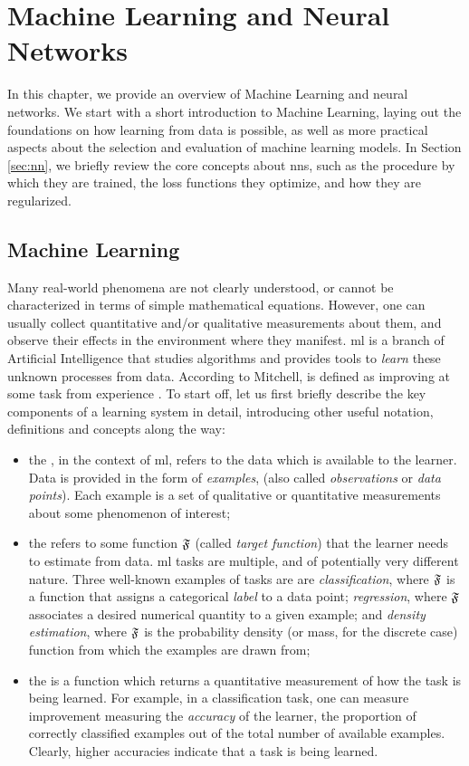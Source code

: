 \chapter{Machine Learning and Neural Networks}\label{ch:neural-networks}
In this chapter, we provide an overview of Machine Learning and neural networks. We start with a short introduction to Machine Learning, laying out the foundations on how learning from data is possible, as well as more practical aspects about the selection and evaluation of machine learning models. In Section \ref{sec:nn}, we briefly review the core concepts about \glspl{nn}, such as the procedure by which they are trained, the loss functions they optimize, and how they are regularized.

\section{Machine Learning}\label{sec:ml}
Many real-world phenomena are not clearly understood, or cannot be characterized in terms of simple mathematical equations. However, one can usually collect quantitative and/or qualitative measurements about them, and observe their effects in the environment where they manifest. \gls{ml} is a branch of Artificial Intelligence that studies algorithms and provides tools to \emph{learn} these unknown processes from data. According to Mitchell,  is defined as improving at some task from experience \citep{mitchell1997ml}. To start off, let us first briefly describe the key components of a learning system in detail, introducing other useful notation, definitions and concepts along the way:

\begin{itemize}
    \item the , in the context of \gls{ml}, refers to
    the data which is available to the learner. Data is provided in the form
    of \emph{examples}, (also called \emph{observations} or \emph{data points}). Each example is a set of qualitative or quantitative measurements about some phenomenon of interest;
    \item the  refers to some function $\mathfrak{F}$ (called \emph{target function}) that the learner needs to estimate from data. \gls{ml} tasks are multiple, and of potentially very different nature. Three well-known examples of tasks are are \emph{classification}, where $\mathfrak{F}$ is a function that assigns a categorical \emph{label} to a data point; \emph{regression}, where $\mathfrak{F}$ associates a desired numerical quantity to a given example; and \emph{density estimation}, where $\mathfrak{F}$ is the probability density (or mass, for the discrete case) function from which the examples are drawn from;
    \item the  is a function which returns a quantitative measurement of how  the task is being learned. For example, in a classification task, one can measure improvement measuring the \emph{accuracy} of the learner, \ie the proportion of correctly classified examples out of the total number of available examples. Clearly, higher accuracies indicate that a task is being learned.
\end{itemize}


